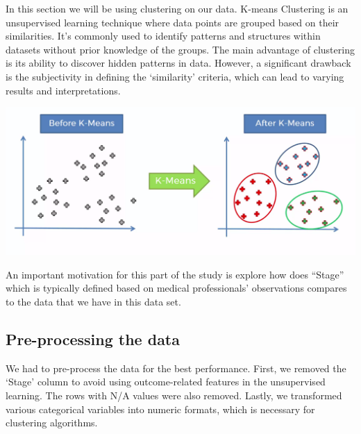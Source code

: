 \documentclass[
]{article}
\begin{document}
In this section we will be using clustering on our data. K-means
Clustering is an unsupervised learning technique where data points are
grouped based on their similarities. It's commonly used to identify
patterns and structures within datasets without prior knowledge of the
groups. The main advantage of clustering is its ability to discover
hidden patterns in data. However, a significant drawback is the
subjectivity in defining the `similarity' criteria, which can lead to
varying results and interpretations.

\href{https://medium.datadriveninvestor.com/k-means-clustering-4a700d4a4720}{\includegraphics{1*fz-rjYPPRlGEMdTI-RLbDg.png}}

An important motivation for this part of the study is explore how does
``Stage'' which is typically defined based on medical professionals'
observations compares to the data that we have in this data set.

\hypertarget{pre-processing-the-data-1}{%
\subsection{Pre-processing the data}\label{pre-processing-the-data-1}}

We had to pre-process the data for the best performance. First, we
removed the `Stage' column to avoid using outcome-related features in
the unsupervised learning. The rows with N/A values were also removed.
Lastly, we transformed various categorical variables into numeric
formats, which is necessary for clustering algorithms.
\end{document}
